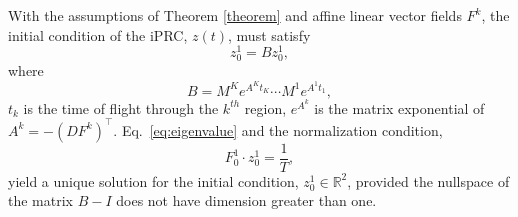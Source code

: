 \documentclass[a4paper,12pt]{article}
\begin{document}
\begin{corollary}
With the assumptions of Theorem \ref{theorem} and affine linear vector fields $F^k$, the initial condition of the iPRC, $z(t)$, must satisfy
 \begin{equation}\label{eq:eigenvalue}
z^1_0=B z^1_0,
\end{equation}
where
\begin{equation}
B=M^{K}e^{A^{K}t_K}\cdots M^1e^{A^1 t_1},
\end{equation}
$t_k$ is the time of flight through the $k^{th}$ region, $e^{A^{k}}$ is the matrix exponential of $A^k = -\left(DF^k\right)^\intercal$.  Eq.~\eqref{eq:eigenvalue} and the normalization condition,
 \begin{equation}\label{eq:normalization}
F_0^1\cdot z^1_0=\frac{1}{T},
\end{equation}
yield a unique solution for the initial condition, $z_0^1 \in \mathbb{R}^2$, provided the nullspace of the matrix $B-I$ does not have dimension greater than one.
\label{corl:circuit}\end{corollary}

\end{document}
